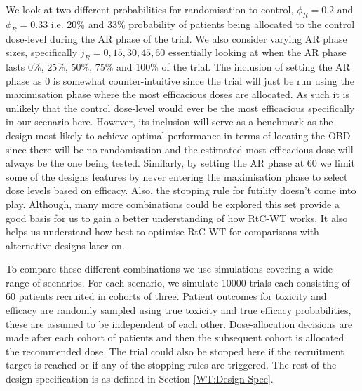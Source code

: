We look at two different probabilities for randomisation to control, $\phi_R = 0.2$ and $\phi_R = 0.33$ i.e. 20\% and 33\% probability of patients being allocated to the control dose-level during the AR phase of the trial. We also consider varying AR phase sizes, specifically $j_R = 0, 15, 30, 45 ,60$ essentially looking at when the AR phase lasts 0\%, 25\%, 50\%, 75\% and 100\% of the trial. The inclusion of setting the AR phase as 0 is somewhat counter-intuitive since the trial will just be run using the maximisation phase where the most efficacious doses are allocated. As such it is unlikely that the control dose-level would ever be the most efficacious specifically in our scenario here. However, its inclusion will serve as a benchmark as the design most likely to achieve optimal performance in terms of locating the OBD since there will be no randomisation and the estimated most efficacious dose will always be the one being tested. Similarly, by setting the AR phase at 60 we limit some of the designs features by never entering the maximisation phase to select dose levels based on efficacy. Also, the stopping rule for futility doesn't come into play. Although, many more combinations could be explored this set provide a good basis for us to gain a better understanding of how RtC-WT works. It also helps us understand how best to optimise RtC-WT for comparisons with alternative designs later on.  

To compare these different combinations we use simulations covering a wide range of scenarios. For each scenario, we simulate 10000 trials each consisting of 60 patients recruited in cohorts of three. Patient outcomes for toxicity and efficacy are randomly sampled using true toxicity and true efficacy probabilities, these are assumed to be independent of each other. Dose-allocation decisions are made after each cohort of patients and then the subsequent cohort is allocated the recommended dose. The trial could also be stopped here if the recruitment target is reached or if any of the stopping rules are triggered. The rest of the design specification is as defined in Section \ref{WT:Design-Spec}. 

